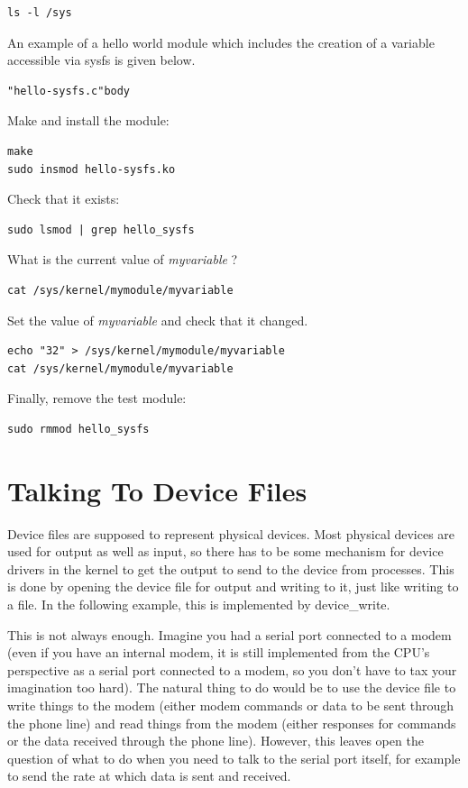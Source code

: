 \documentclass[11pt]{article}
\begin{document}
\begin{verbatim}
ls -l /sys
\end{verbatim}

An example of a hello world module which includes the creation of a variable accessible via sysfs is given below.

\begin{verbatim}
"hello-sysfs.c"body
\end{verbatim}

Make and install the module:

\begin{verbatim}
make
sudo insmod hello-sysfs.ko
\end{verbatim}

Check that it exists:

\begin{verbatim}
sudo lsmod | grep hello_sysfs
\end{verbatim}

What is the current value of \emph{myvariable} ?

\begin{verbatim}
cat /sys/kernel/mymodule/myvariable
\end{verbatim}

Set the value of \emph{myvariable} and check that it changed.

\begin{verbatim}
echo "32" > /sys/kernel/mymodule/myvariable
cat /sys/kernel/mymodule/myvariable
\end{verbatim}

Finally, remove the test module:

\begin{verbatim}
sudo rmmod hello_sysfs
\end{verbatim}

\section*{Talking To Device Files}
\label{sec-9}
Device files are supposed to represent physical devices. Most physical devices are used for output as well as input, so there has to be some mechanism for device drivers in the kernel to get the output to send to the device from processes. This is done by opening the device file for output and writing to it, just like writing to a file. In the following example, this is implemented by device\_write.

This is not always enough. Imagine you had a serial port connected to a modem (even if you have an internal modem, it is still implemented from the CPU's perspective as a serial port connected to a modem, so you don't have to tax your imagination too hard). The natural thing to do would be to use the device file to write things to the modem (either modem commands or data to be sent through the phone line) and read things from the modem (either responses for commands or the data received through the phone line). However, this leaves open the question of what to do when you need to talk to the serial port itself, for example to send the rate at which data is sent and received.
\end{document}
